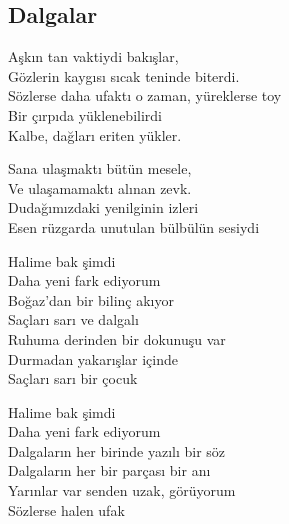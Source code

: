 \subsection{Dalgalar}

Aşkın tan vaktiydi bakışlar, \\
Gözlerin kaygısı sıcak teninde biterdi. \\
Sözlerse daha ufaktı o zaman, yüreklerse toy \\
Bir çırpıda yüklenebilirdi \\
Kalbe, dağları eriten yükler.

\noindent\newline
Sana ulaşmaktı bütün mesele, \\
Ve ulaşamamaktı alınan zevk. \\
Dudağımızdaki yenilginin izleri \\
Esen rüzgarda unutulan bülbülün sesiydi

\noindent\newline
Halime bak şimdi \\
Daha yeni fark ediyorum \\
Boğaz'dan bir bilinç akıyor \\
Saçları sarı ve dalgalı \\
Ruhuma derinden bir dokunuşu var \\
Durmadan yakarışlar içinde \\
Saçları sarı bir çocuk

\noindent\newline
Halime bak şimdi \\
Daha yeni fark ediyorum \\
Dalgaların her birinde yazılı bir söz \\
Dalgaların her bir parçası bir anı \\
Yarınlar var senden uzak, görüyorum \\
Sözlerse halen ufak
